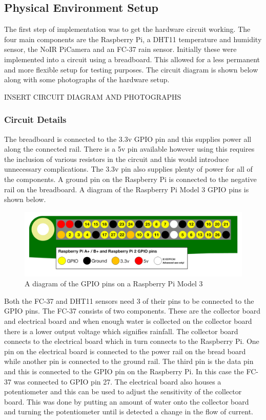 \documentclass[10pt,a4paper]{article}
\begin{document}
\subsection{Physical Environment Setup}
The first step of implementation was to get the hardware circuit working. The four main components are the Raspberry Pi, a DHT11 temperature and humidity sensor, the NoIR PiCamera and an FC-37 rain sensor. Initially these were implemented into a circuit using a breadboard. This allowed for a less permanent and more flexible setup for testing purposes. The circuit diagram is shown below along with some photographs of the hardware setup. 

INSERT CIRCUIT DIAGRAM AND PHOTOGRAPHS

\subsubsection{Circuit Details}
The breadboard is connected to the 3.3v GPIO pin and this supplies power all along the connected rail. There is a 5v pin available however using this requires the inclusion of various resistors in the circuit and this would introduce unnecessary complications. The 3.3v pin also supplies plenty of power for all of the components. A ground pin on the Raspberry Pi is connected to the negative rail on the breadboard. A diagram of the Raspberry Pi Model 3 GPIO pins is shown below. 
\begin{figure}[H]
  \centering
    \includegraphics[width=\linewidth]{images/gpio-pins.png}
    \caption{A diagram of the GPIO pins on a Raspberry Pi Model 3}
    \label{fig:gpiopins}
  \end{figure}

Both the FC-37 and DHT11 sensors need 3 of their pins to be connected to the GPIO pins. The FC-37 consists of two components. These are the collector board and electrical board and when enough water is collected on the collector board there is a lower output voltage which signifies rainfall. The collector board connects to the electrical board which in turn connects to the Raspberry Pi. One pin on the electrical board is connected to the power rail on the bread board while another pin is connected to the ground rail. The third pin is the data pin and this is connected to the GPIO pin on the Raspberry Pi. In this case the FC-37 was connected to GPIO pin 27. The electrical board also houses a potentiometer and this can be used to adjust the sensitivity of the collector board. This was done by putting an amount of water onto the collector board and turning the potentiometer until is detected a change in the flow of current.
\end{document}

